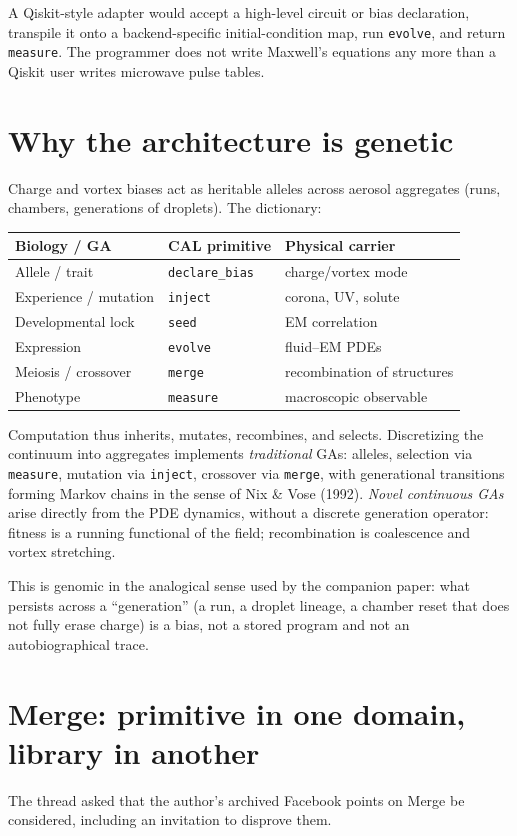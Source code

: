 \documentclass[11pt,a4paper]{article}
\begin{document}
A Qiskit-style adapter would accept a high-level circuit or bias declaration, transpile it onto a backend-specific initial-condition map, run \texttt{evolve}, and return \texttt{measure}. The programmer does not write Maxwell's equations any more than a Qiskit user writes microwave pulse tables.

\section{Why the architecture is genetic}
Charge and vortex biases act as heritable alleles across aerosol aggregates (runs, chambers, generations of droplets). The dictionary:

\begin{center}
\begin{tabular}{@{}lll@{}}
\toprule
\textbf{Biology / GA} & \textbf{CAL primitive} & \textbf{Physical carrier} \\
\midrule
Allele / trait & \texttt{declare\_bias} & charge/vortex mode \\
Experience / mutation & \texttt{inject} & corona, UV, solute \\
Developmental lock & \texttt{seed} & EM correlation \\
Expression & \texttt{evolve} & fluid--EM PDEs \\
Meiosis / crossover & \texttt{merge} & recombination of structures \\
Phenotype & \texttt{measure} & macroscopic observable \\
\bottomrule
\end{tabular}
\end{center}

Computation thus inherits, mutates, recombines, and selects. Discretizing the continuum into aggregates implements \emph{traditional} GAs: alleles, selection via \texttt{measure}, mutation via \texttt{inject}, crossover via \texttt{merge}, with generational transitions forming Markov chains in the sense of Nix \& Vose (1992). \emph{Novel continuous GAs} arise directly from the PDE dynamics, without a discrete generation operator: fitness is a running functional of the field; recombination is coalescence and vortex stretching.

This is genomic in the analogical sense used by the companion paper: what persists across a ``generation'' (a run, a droplet lineage, a chamber reset that does not fully erase charge) is a bias, not a stored program and not an autobiographical trace.

\section{Merge: primitive in one domain, library in another}
The thread asked that the author's archived Facebook points on Merge be considered, including an invitation to disprove them.
\end{document}
